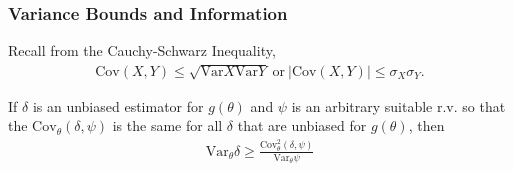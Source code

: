\subsubsection{Variance Bounds and Information}

Recall from the Cauchy-Schwarz Inequality,
\begin{gather}
    \mathrm{Cov}(X,Y)\leq\sqrt{\mathrm{Var}X\mathrm{Var}Y}~\text{or}~|\mathrm{Cov}(X,Y)|\leq\sigma_X\sigma_Y.
\end{gather}

If $\delta$ is an unbiased estimator for $g(\theta)$ and $\psi$ is an arbitrary suitable r.v.
so that the $\mathrm{Cov}_\theta(\delta,\psi)$ is the same for all $\delta$ that are unbiased for $g(\theta)$, then
\begin{gather}
    \mathrm{Var}_\theta\delta\geq\frac{\mathrm{Cov}_\theta^2(\delta,\psi)}{\mathrm{Var}_\theta\psi}
\end{gather}


